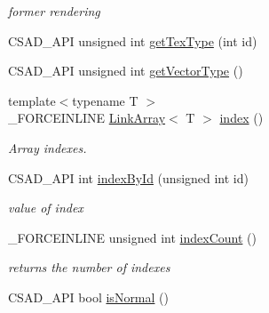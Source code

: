 \begin{DoxyCompactItemize}
\begin{DoxyCompactList}\small\item\em former rendering \end{DoxyCompactList}\item 
C\-S\-A\-D\-\_\-\-A\-P\-I unsigned int \hyperlink{classcsad_1_1_mesh_a9f243f44460f4de840b62b2101fdd370}{get\-Tex\-Type} (int id)
\item 
C\-S\-A\-D\-\_\-\-A\-P\-I unsigned int \hyperlink{classcsad_1_1_mesh_a283769e189167b4d4dfe32c0027e7485}{get\-Vector\-Type} ()
\item 
\hypertarget{classcsad_1_1_mesh_af203cd54a3c46b3c720405bfe8c01f3d}{{\footnotesize template$<$typename T $>$ }\\\-\_\-\-F\-O\-R\-C\-E\-I\-N\-L\-I\-N\-E \hyperlink{classbt_1_1_link_array}{Link\-Array}$<$ T $>$ \hyperlink{classcsad_1_1_mesh_af203cd54a3c46b3c720405bfe8c01f3d}{index} ()}\label{classcsad_1_1_mesh_af203cd54a3c46b3c720405bfe8c01f3d}

\begin{DoxyCompactList}\small\item\em Array indexes. \end{DoxyCompactList}\item 
\hypertarget{classcsad_1_1_mesh_a981d20a6176d6d185e19422746c5e086}{C\-S\-A\-D\-\_\-\-A\-P\-I int \hyperlink{classcsad_1_1_mesh_a981d20a6176d6d185e19422746c5e086}{index\-By\-Id} (unsigned int id)}\label{classcsad_1_1_mesh_a981d20a6176d6d185e19422746c5e086}

\begin{DoxyCompactList}\small\item\em value of index \end{DoxyCompactList}\item 
\hypertarget{classcsad_1_1_mesh_a71e46470010e0905fcfa50b915f17716}{\-\_\-\-F\-O\-R\-C\-E\-I\-N\-L\-I\-N\-E unsigned int \hyperlink{classcsad_1_1_mesh_a71e46470010e0905fcfa50b915f17716}{index\-Count} ()}\label{classcsad_1_1_mesh_a71e46470010e0905fcfa50b915f17716}

\begin{DoxyCompactList}\small\item\em returns the number of indexes \end{DoxyCompactList}\item 
\hypertarget{classcsad_1_1_mesh_a349384032c4f2c6dca94d5db2bf09244}{C\-S\-A\-D\-\_\-\-A\-P\-I bool \hyperlink{classcsad_1_1_mesh_a349384032c4f2c6dca94d5db2bf09244}{is\-Normal} ()}\label{classcsad_1_1_mesh_a349384032c4f2c6dca94d5db2bf09244}


\end{DoxyCompactItemize}
